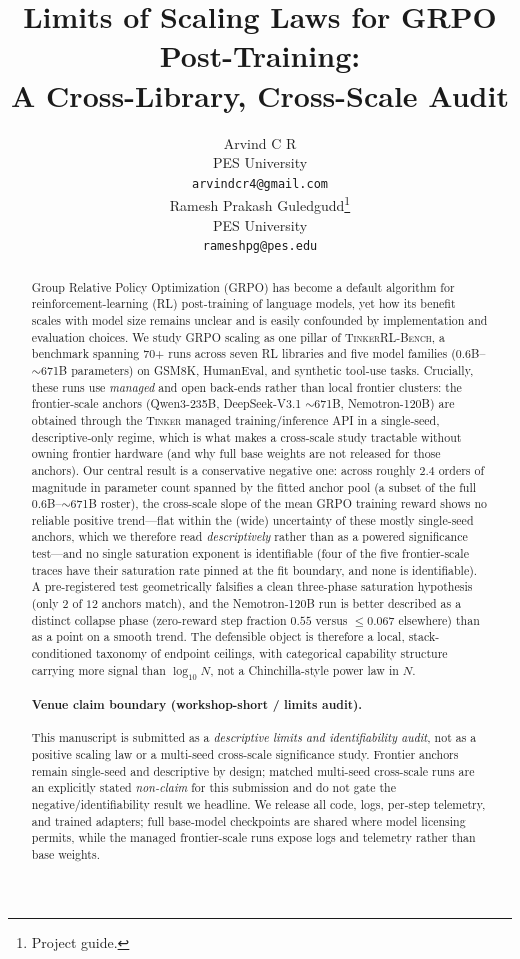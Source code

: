 \documentclass{article}
\title{Limits of Scaling Laws for GRPO Post-Training:\\
       A Cross-Library, Cross-Scale Audit}
\author{
  Arvind C R \\
  PES University\\
  \texttt{arvindcr4@gmail.com} \\
  \And
  Ramesh Prakash Guledgudd\thanks{Project guide.} \\
  PES University\\
  \texttt{rameshpg@pes.edu} \\
}
\newcommand{\ours}{\textsc{TinkerRL-Bench}}
\begin{document}
\sloppy {}  \hfuzz=2pt
\maketitle
\begin{abstract}
Group Relative Policy Optimization (GRPO) has become a default algorithm for
reinforcement-learning (RL) post-training of language models, yet how its benefit
scales with model size remains unclear and is easily confounded by implementation
and evaluation choices. We study GRPO scaling as one pillar of \ours{}, a
benchmark spanning 70+ runs across seven RL libraries and five model families
($0.6$B--$\sim$671B parameters) on GSM8K, HumanEval, and synthetic tool-use tasks.
Crucially, these runs use \emph{managed} and open back-ends rather than local
frontier clusters: the frontier-scale anchors (Qwen3-235B, DeepSeek-V3.1
$\sim$671B, Nemotron-120B) are obtained through the \textsc{Tinker} managed
training/inference API in a single-seed, descriptive-only regime, which is what
makes a cross-scale study tractable without owning frontier hardware (and why full
base weights are not released for those anchors).
Our central result is a conservative negative one: across roughly $2.4$ orders of
magnitude in parameter count spanned by the fitted anchor pool (a subset of the
full $0.6$B--$\sim$671B roster), the cross-scale slope of the mean GRPO training
reward shows no reliable positive trend---flat within the (wide) uncertainty of
these mostly single-seed anchors, which we therefore read \emph{descriptively}
rather than as a powered significance test---and no single saturation exponent is identifiable
(four of the five frontier-scale traces have their saturation rate pinned at the
fit boundary, and none is identifiable). A pre-registered test geometrically falsifies a clean three-phase
saturation hypothesis (only $2$ of $12$ anchors match), and the Nemotron-120B run
is better described as a distinct collapse phase (zero-reward step fraction $0.55$
versus $\le 0.067$ elsewhere) than as a point on a smooth trend. The defensible
object is therefore a local, stack-conditioned taxonomy of endpoint ceilings,
with categorical capability structure carrying more signal than $\log_{10} N$,
not a Chinchilla-style power law in $N$.
\paragraph{Venue claim boundary (workshop-short / limits audit).}
This manuscript is submitted as a \emph{descriptive limits and identifiability
audit}, not as a positive scaling law or a multi-seed cross-scale significance
study. Frontier anchors remain single-seed and descriptive by design; matched
multi-seed cross-scale runs are an explicitly stated \emph{non-claim} for this
submission and do not gate the negative/identifiability result we headline.
We
release all code, logs, per-step telemetry, and trained adapters; full base-model
checkpoints are shared where model licensing permits, while the managed
frontier-scale runs expose logs and telemetry rather than base weights.
\end{abstract}
 
\end{document}
